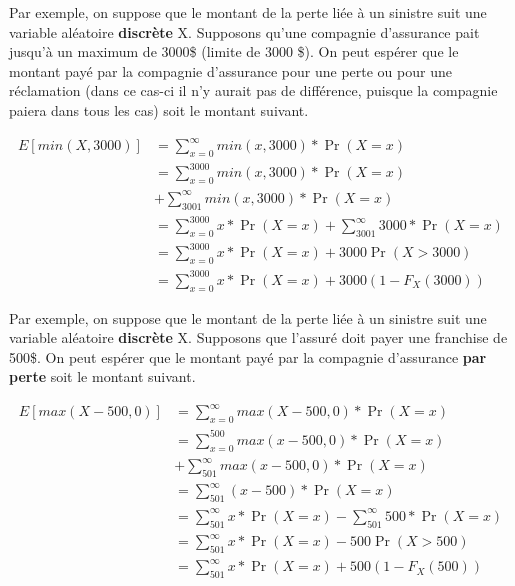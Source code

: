\documentclass[10pt, french]{article}
\begin{document}
\begin{multicols*}{2}
\begin{definitionNOHFILLprop}
\end{definitionNOHFILLprop}

\begin{definitionNOHFILLprop}
Par exemple, on suppose que le montant de la perte liée à un sinistre suit une variable aléatoire \textbf{discrète} X. Supposons qu'une compagnie d'assurance pait jusqu'à un maximum de 3000\$ (limite de 3000 \$). On peut espérer que le montant payé par la compagnie d'assurance pour une perte ou pour une réclamation (dans ce cas-ci il n'y aurait pas de différence, puisque la compagnie paiera dans tous les cas) soit le montant suivant.

\begin{align*}
  E[min(X, 3000)]&= \sum_{x=0}^\infty min(x, 3000) * \Pr(X = x) 
  \\&= \sum_{x=0}^{3000} min(x, 3000) * \Pr(X = x) 
  \\&+ \sum_{3001}^\infty min(x, 3000) * \Pr(X = x)
  \\&= \sum_{x=0}^{3000} x * \Pr(X = x) + \sum_{3001}^\infty 3000 * \Pr(X = x) 
  \\&= \sum_{x=0}^{3000} x * \Pr(X = x) + 3000 \Pr(X > 3000)
  \\&= \sum_{x=0}^{3000} x * \Pr(X = x) + 3000 (1 - F_X(3000))
  \end{align*}

\end{definitionNOHFILLprop}

\begin{definitionNOHFILLprop}
Par exemple, on suppose que le montant de la perte liée à un sinistre suit une variable aléatoire \textbf{discrète} X. Supposons que l'assuré doit payer une franchise de 500\$. On peut espérer que le montant payé par la compagnie d'assurance \textbf{par perte} soit le montant suivant.

\begin{align*}
  E[max(X - 500, 0)]&= \sum_{x=0}^\infty max(X - 500, 0) * \Pr(X = x) 
  \\&= \sum_{x=0}^{500} max(x - 500, 0) * \Pr(X = x)  
  \\&+ \sum_{501}^\infty max(x - 500, 0) * \Pr(X = x)
  \\&= \sum_{501}^\infty (x - 500) * \Pr(X = x)
  \\&= \sum_{501}^\infty x * \Pr(X = x) - \sum_{501}^\infty 500 * \Pr(X = x) 
  \\&= \sum_{501}^\infty x * \Pr(X = x) - 500 \Pr(X > 500)
  \\&= \sum_{501}^\infty x * \Pr(X = x) + 500(1 - F_X(500))
  \end{align*}
  

\end{definitionNOHFILLprop}
\end{multicols*}
\end{document}
